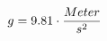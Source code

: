 \documentclass[preview]{standalone}
\begin{document}
\begin{align*}
\special{dvisvgm:raw <g id='unique000'>}g = 9.81 \cdot \frac{Meter}{s^{2}}\special{dvisvgm:raw </g>}
\end{align*}
\end{document}
